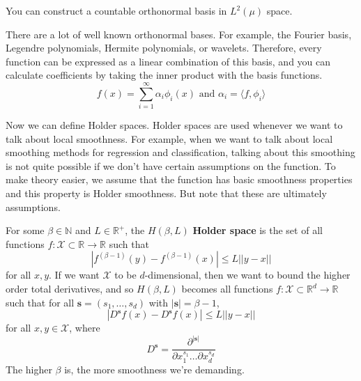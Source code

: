 \documentclass{article}
\begin{document}
  \begin{theorem}
    You can construct a countable orthonormal basis in $L^2 (\mu)$ space. 
  \end{theorem}

  There are a lot of well known orthonormal bases. For example, the Fourier basis, Legendre polynomials, Hermite polynomials, or wavelets. Therefore, every function can be expressed as a linear combination of this basis, and you can calculate coefficients by taking the inner product with the basis functions. 
  \begin{equation}
    f(x) = \sum_{i=1}^\infty \alpha_i \phi_i (x) \text{ and } \alpha_i = \langle f, \phi_i \rangle
  \end{equation}

  Now we can define Holder spaces. Holder spaces are used whenever we want to talk about local smoothness. For example, when we want to talk about local smoothing methods for regression and classification, talking about this smoothing is not quite possible if we don't have certain assumptions on the function. To make theory easier, we assume that the function has basic smoothness properties and this property is Holder smoothness. But note that these are ultimately assumptions. 


  \begin{definition}
    For some $\beta \in \mathbb{N}$ and $L \in \mathbb{R}^+$, the $H(\beta, L)$ \textbf{Holder space} is the set of all functions $f: \mathcal{X} \subset \mathbb{R} \rightarrow \mathbb{R}$ such that 
    \begin{equation}
      |f^{(\beta - 1)}(y) - f^{(\beta - 1)}(x)| \leq L ||y - x||
    \end{equation}
    for all $x, y$. If we want $\mathcal{X}$ to be $d$-dimensional, then we want to bound the higher order total derivatives, and so $H(\beta, L)$ becomes all functions $f: \mathcal{X} \subset \mathbb{R}^d \rightarrow \mathbb{R}$ such that for all $\mathbf{s} = (s_1, \ldots, s_d)$ with $|\mathbf{s}| = \beta - 1$,
    \begin{equation}
      |D^{\mathbf{s}} f(x) - D^{\mathbf{s}} f(x)| \leq L ||y - x||
    \end{equation}
    for all $x, y \in \mathcal{X}$, where 
    \begin{equation}
      D^{\mathbf{s}} = \frac{\partial^{|\mathbf{s}|}}{\partial x_1^{s_1} \ldots \partial x_d^{s_d}} 
    \end{equation}
    The higher $\beta$ is, the more smoothness we're demanding. 
  \end{definition}
\end{document}
